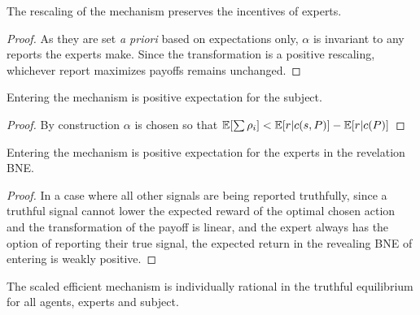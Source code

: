 
\begin{lem}
	The rescaling of the mechanism preserves the incentives of experts.
\end{lem}

\begin{proof}
	As they are set \emph{a priori} based on expectations only, $\alpha$ is invariant to any reports the experts make. Since the transformation is a positive rescaling, whichever report maximizes payoffs remains unchanged. 
\end{proof}


\begin{lem}
	Entering the mechanism is positive expectation for the subject.
\end{lem}

\begin{proof}
  By construction $\alpha$ is chosen so that $\operatorname*{\mathbb E}[\sum \rho_i] < \operatorname*{\mathbb E}[r|c(s,P)] - \operatorname*{\mathbb E}[r|c(P)]$
\end{proof}


\begin{lem}
	Entering the mechanism is positive expectation for the experts in the revelation BNE.
\end{lem}

\begin{proof}
In a case where all other signals are being reported truthfully, since a truthful signal cannot lower the expected reward of the optimal chosen action and the transformation of the payoff is linear, and the expert always has the option of reporting their true signal, the expected return in the revealing BNE of entering is weakly positive.
\end{proof}


\begin{thm}
	The scaled efficient mechanism is individually rational in the truthful equilibrium for all agents, experts and subject.
\end{thm}

